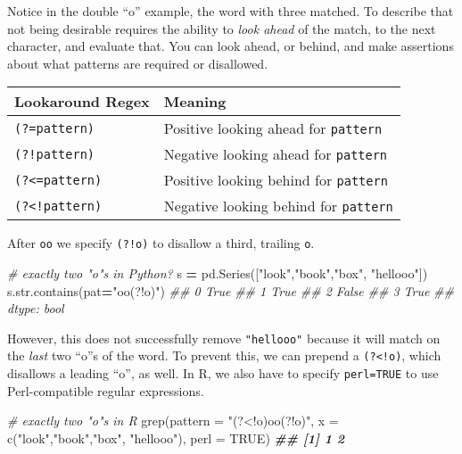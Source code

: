 \documentclass[
  12pt,
  krantz2]{krantz}
\makeatletter
\newenvironment{Shaded}{\begin{snugshade}}{\end{snugshade}}
\newcommand{\AttributeTok}[1]{\textcolor[rgb]{0.61,0.61,0.61}{#1}}
\newcommand{\BuiltInTok}[1]{#1}
\newcommand{\CommentTok}[1]{\textcolor[rgb]{0.37,0.37,0.37}{\textit{#1}}}
\newcommand{\ConstantTok}[1]{\textcolor[rgb]{0,0,0}{#1}}
\newcommand{\DocumentationTok}[1]{\textcolor[rgb]{0.37,0.37,0.37}{\textbf{\textit{#1}}}}
\newcommand{\FunctionTok}[1]{\textcolor[rgb]{0,0,0}{#1}}
\newcommand{\NormalTok}[1]{#1}
\newcommand{\OperatorTok}[1]{\textcolor[rgb]{0.43,0.43,0.43}{\textbf{#1}}}
\newcommand{\StringTok}[1]{\textcolor[rgb]{0.5,0.5,0.5}{#1}}
\newenvironment{kframe}{%
\medskip{}
\setlength{\fboxsep}{.8em}
 \def\at@end@of@kframe{}%
 \ifinner\ifhmode%
  \def\at@end@of@kframe{\end{minipage}}%
  \begin{minipage}{\columnwidth}%
 \fi\fi%
 \def\FrameCommand##1{\hskip\@totalleftmargin \hskip-\fboxsep
 \colorbox{shadecolor}{##1}\hskip-\fboxsep
     \hskip-\linewidth \hskip-\@totalleftmargin \hskip\columnwidth}%
 \MakeFramed {\advance\hsize-\width
   \@totalleftmargin\z@ \linewidth\hsize
   \@setminipage}}%
 {\par\unskip\endMakeFramed%
 \at@end@of@kframe}
\renewenvironment{Shaded}{\begin{kframe}}{\end{kframe}}
\makeatother
\begin{document}
Notice in the double ``o'' example, the word with three matched. To describe that not being desirable requires the ability to \emph{look ahead} of the match, to the next character, and evaluate that. You can look ahead, or behind, and make assertions about what patterns are required or disallowed.

\begin{longtable}[]{@{}ll@{}}
\toprule()
Lookaround Regex & Meaning \\
\midrule()
\endhead
\texttt{(?=pattern)} & Positive looking ahead for \texttt{pattern} \\
\texttt{(?!pattern)} & Negative looking ahead for \texttt{pattern} \\
\texttt{(?\textless{}=pattern)} & Positive looking behind for \texttt{pattern} \\
\texttt{(?\textless{}!pattern)} & Negative looking behind for \texttt{pattern} \\
\bottomrule()
\end{longtable}

After \texttt{oo} we specify \texttt{(?!o)} to disallow a third, trailing \texttt{o}.

\begin{Shaded}
\begin{Highlighting}[]
\CommentTok{\# exactly two "o"s in Python?}
\NormalTok{s }\OperatorTok{=}\NormalTok{ pd.Series([}\StringTok{"look"}\NormalTok{,}\StringTok{"book"}\NormalTok{,}\StringTok{"box"}\NormalTok{, }\StringTok{"hellooo"}\NormalTok{])}
\NormalTok{s.}\BuiltInTok{str}\NormalTok{.contains(pat}\OperatorTok{=}\StringTok{"oo(?!o)"}\NormalTok{)}
\CommentTok{\#\# 0     True}
\CommentTok{\#\# 1     True}
\CommentTok{\#\# 2    False}
\CommentTok{\#\# 3     True}
\CommentTok{\#\# dtype: bool}
\end{Highlighting}
\end{Shaded}

However, this does not successfully remove \texttt{"hellooo"} because it will match on the \emph{last} two ``o''s of the word. To prevent this, we can prepend a \texttt{(?\textless{}!o)}, which disallows a leading ``o'', as well. In R, we also have to specify \texttt{perl=TRUE} to use Perl-compatible regular expressions.

\begin{Shaded}
\begin{Highlighting}[]
\CommentTok{\# exactly two "o"s in R}
\FunctionTok{grep}\NormalTok{(}\AttributeTok{pattern =} \StringTok{"(?\textless{}!o)oo(?!o)"}\NormalTok{, }
     \AttributeTok{x =} \FunctionTok{c}\NormalTok{(}\StringTok{"look"}\NormalTok{,}\StringTok{"book"}\NormalTok{,}\StringTok{"box"}\NormalTok{, }\StringTok{"hellooo"}\NormalTok{), }\AttributeTok{perl =} \ConstantTok{TRUE}\NormalTok{)}
\DocumentationTok{\#\# [1] 1 2}
\end{Highlighting}
\end{Shaded}
\end{document}
